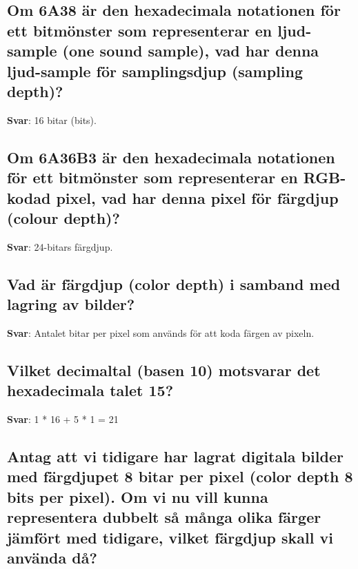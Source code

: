 \documentclass[a4paper,11pt,oneside]{article}
\begin{document}
\begin{sloppypar}
\subsection{Om 6A38 \"ar den hexadecimala notationen f\"or ett bitm\"onster som representerar en ljud-sample (one sound sample), vad har denna ljud-sample f\"or samplingsdjup (sampling depth)?}

\label{q:71:sa:sv:True}

\textbf{Svar}: 16 bitar (bits).



\subsection{Om 6A36B3 \"ar den hexadecimala notationen f\"or ett bitm\"onster som representerar en RGB-kodad pixel, vad har denna pixel f\"or f\"argdjup (colour depth)?}

\label{q:72:sa:sv:True}

\textbf{Svar}: 24-bitars f\"argdjup.



\subsection{Vad \"ar f\"argdjup (color depth) i samband med lagring av bilder?}

\label{q:73:sa:sv:True}

\textbf{Svar}: Antalet bitar per pixel som anv\"ands f\"or att koda f\"argen av pixeln.



\subsection{Vilket decimaltal (basen 10) motsvarar det hexadecimala talet 15?}

\label{q:74:sa:sv:True}

\textbf{Svar}: 1 * 16 + 5 * 1 = 21



\subsection{Antag att vi tidigare har lagrat digitala bilder med f\"argdjupet 8 bitar per pixel (color depth 8 bits per pixel). Om vi nu vill kunna representera dubbelt s\r{a} m\r{a}nga olika f\"arger j\"amf\"ort med tidigare, vilket f\"argdjup skall vi anv\"anda d\r{a}?}

\label{q:76:sa:sv:True}


\end{sloppypar}
\end{document}
